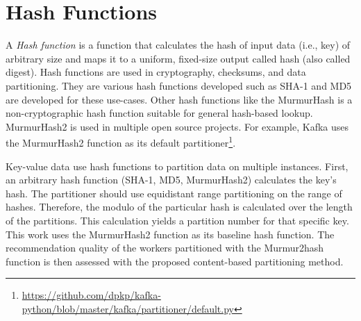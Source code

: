 \section{Hash Functions}
\label{sec:hash-functions}
A \emph{Hash function} is a function that calculates the hash of input data (i.e., key) of arbitrary size and maps it to a uniform, fixed-size output called hash (also called digest). Hash functions are used in cryptography, checksums, and data partitioning. They are various hash functions developed such as SHA-1 \cite{RFC3174USSecure} and MD5 \cite{rivestRFC1321MD5MessageDigest1992} are developed for these use-cases. Other hash functions like the MurmurHash is a non-cryptographic hash function suitable for general hash-based lookup. MurmurHash2 is used in multiple open source projects. For example, Kafka uses the MurmurHash2 function as its default partitioner\footnote{\url{https://github.com/dpkp/kafka-python/blob/master/kafka/partitioner/default.py}}.


Key-value data use hash functions to partition data on multiple instances. First, an arbitrary hash function (SHA-1, MD5, MurmurHash2) calculates the key's hash. The partitioner should use equidistant range partitioning on the range of hashes. Therefore, the modulo of the particular hash is calculated over the length of the partitions. This calculation yields a partition number for that specific key. This work uses the MurmurHash2 function as its baseline hash function. The recommendation quality of the workers partitioned with the Murmur2hash function is then assessed with the proposed content-based partitioning method.

